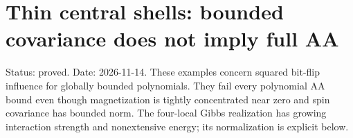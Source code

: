 \section{Thin central shells: bounded covariance does not imply full
AA}\label{proof:thin_shell_obstruction}

Status: proved. Date: 2026-11-14. These examples concern squared
bit-flip influence for globally bounded polynomials. They fail every
polynomial AA bound even though magnetization is tightly concentrated
near zero and spin covariance has bounded norm. The four-local Gibbs
realization has growing interaction strength and nonextensive energy;
its normalization is explicit below.







